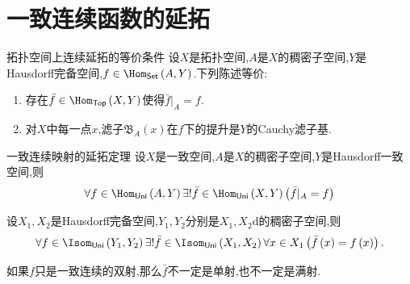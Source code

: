 \section{一致连续函数的延拓}

\begin{proposition}{拓扑空间上连续延拓的等价条件}{}
	设$X$是拓扑空间,$A$是$X$的稠密子空间,$Y$是Hausdorff完备空间,$f\in\Hom_{\mathsf{Set}}\left(A,Y\right)$.下列陈述等价:
	\begin{enumerate}
		\item 存在$\bar{f}\in\Hom_{\mathsf{Top}}\left(X,Y\right)$使得$\bar{f}|_{A}=f$.
		\item 对$X$中每一点$x$,滤子$\mathfrak{B}_{A}\left(x\right)$在$f$下的提升是$Y$的Cauchy滤子基.
	\end{enumerate}
\end{proposition}

\begin{theorem}{一致连续映射的延拓定理}{}
	设$X$是一致空间,$A$是$X$的稠密子空间,$Y$是Hausdorff一致空间,则
	\begin{align*}
		\forall f\in\Hom_{\mathsf{Uni}}\left(A,Y\right)\exists!\bar{f}\in\Hom_{\mathsf{Uni}}\left(X,Y\right)\left(\bar{f}|_{A}=f\right)
	\end{align*}
\end{theorem}

\begin{corollary}{}{}
	设$X_{1},X_{2}$是Hausdorff完备空间,$Y_{1},Y_{2}$分别是$X_{1},X_{2}$d的稠密子空间,则
	\begin{align*}
		\forall f\in\Isom_{\mathsf{Uni}}\left(Y_{1},Y_{2}\right)\exists!\bar{f}\in\Isom_{\mathsf{Uni}}\left(X_{1},X_{2}\right)\forall x\in X_{1}\left(\bar{f}\left(x\right)=f\left(x\right)\right).
	\end{align*}
\end{corollary}

\begin{remark}{}{}
	如果$f$只是一致连续的双射,那么$\bar{f}$不一定是单射,也不一定是满射.
\end{remark}